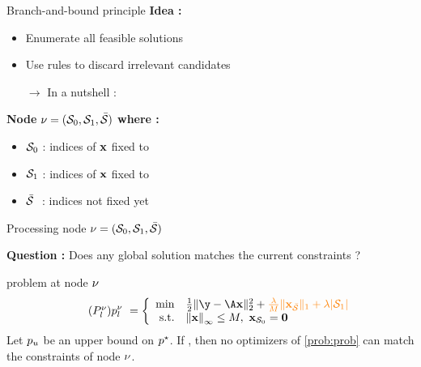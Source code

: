 \documentclass[10pt]{beamer}
\begin{document}
\begin{frame}{Branch-and-bound principle}
  \textbf{Idea :}
  \begin{itemize}
    \item Enumerate all feasible solutions
    \item Use rules to discard irrelevant candidates
    \item[$\rightarrow$] In a nutshell :  
  \end{itemize}

  \pause

  \textbf{Node} $\nu = (\mathcal{S}_0,\mathcal{S}_1,\bar{\mathcal{S}})$ \textbf{where :}
  \begin{itemize}
    \item $\mathcal{S}_0$ : indices of $\mathbf{x}$ fixed to 
    \item $\mathcal{S}_1$ : indices of $\mathbf{x}$ fixed to 
    \item $\bar{\mathcal{S}} \ $ : indices not fixed yet
  \end{itemize}

  \pause

  \begin{figure}
    \centering
    \scalebox{0.7}{}
  \end{figure}
\end{frame}

\begin{frame}{Processing node $\nu = (\mathcal{S}_0,\mathcal{S}_1,\bar{\mathcal{S}})$}

  \textbf{Question :} Does any global solution matches the current constraints ? 

  \pause

  \vspace{0.2cm}

  \begin{block}{ problem at node $\nu$}
    \begin{equation}
      \label{prob:relax-node} \tag{\(\node{\rpb}\)}
      \node{\robj} \ =
      \left\{
      \begin{array}{rl}
        \min & \tfrac{1}{2} \norm{\obs-\dic\pv}{2}^2 + 
        \emphone{\tfrac{\reg}{\bigM} \norm{\subnone{\pv}}{1} + \reg \card{\setone}}
        \\
        \text{s.t.} & \kvvbar{\pv}_{\infty} \leq \bigM, \ \subzero{\pv} = \0
      \end{array}
      \right.
    \end{equation}
    Let $p_u$ be an upper bound on $p^{\star}$. If \emphone{$\UB{\pobj} < \node{\robj}$}, then no optimizers of \eqref{prob:prob} can match the constraints of node $\nu$.
  \end{block}
\end{frame}
\end{document}
